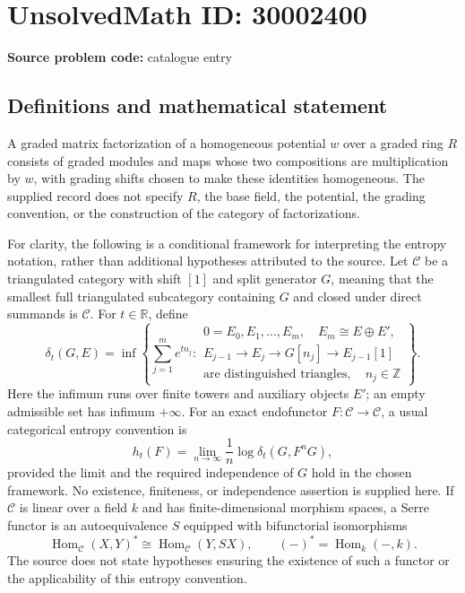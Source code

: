 \documentclass[11pt]{article}
\newcommand{\Z}{\mathbb{Z}}
\newcommand{\R}{\mathbb{R}}
\begin{document}
\section*{UnsolvedMath ID: 30002400}
\textbf{Source problem code:} catalogue entry
\subsection{Definitions and mathematical statement}
A graded matrix factorization of a homogeneous potential \(w\) over a graded ring \(R\) consists of graded modules and maps whose two compositions are multiplication by \(w\), with grading shifts chosen to make these identities homogeneous. The supplied record does not specify \(R\), the base field, the potential, the grading convention, or the construction of the category of factorizations.

For clarity, the following is a conditional framework for interpreting the entropy notation, rather than additional hypotheses attributed to the source. Let \(\mathcal C\) be a triangulated category with shift \([1]\) and split generator \(G\), meaning that the smallest full triangulated subcategory containing \(G\) and closed under direct summands is \(\mathcal C\). For \(t\in\R\), define
\[
\delta_t(G,E)=\inf\left\{\sum_{j=1}^{m}e^{t n_j}:\begin{array}{l}0=E_0,E_1,\ldots,E_m,\quad E_m\cong E\oplus E',\\ E_{j-1}\longrightarrow E_j\longrightarrow G[n_j]\longrightarrow E_{j-1}[1]\\ \text{are distinguished triangles},\quad n_j\in\Z\end{array}\right\}.
\]
Here the infimum runs over finite towers and auxiliary objects \(E'\); an empty admissible set has infimum \(+\infty\). For an exact endofunctor \(F\colon\mathcal C\to\mathcal C\), a usual categorical entropy convention is
\[
h_t(F)=\lim_{n\to\infty}\frac{1}{n}\log\delta_t(G,F^nG),
\]
provided the limit and the required independence of \(G\) hold in the chosen framework. No existence, finiteness, or independence assertion is supplied here. If \(\mathcal C\) is linear over a field \(k\) and has finite-dimensional morphism spaces, a Serre functor is an autoequivalence \(S\) equipped with bifunctorial isomorphisms
\[
\operatorname{Hom}_{\mathcal C}(X,Y)^*\cong\operatorname{Hom}_{\mathcal C}(Y,SX),\qquad (-)^*=\operatorname{Hom}_k(-,k).
\]
The source does not state hypotheses ensuring the existence of such a functor or the applicability of this entropy convention.
\end{document}
